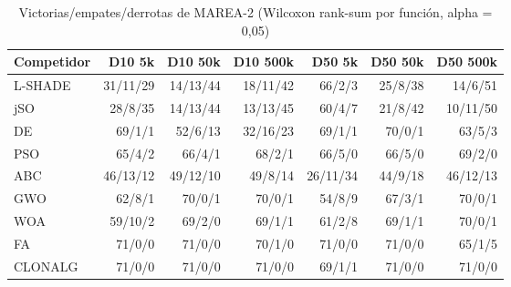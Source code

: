 \begin{table}[ht]\centering\small
\caption{Victorias/empates/derrotas de MAREA-2 (Wilcoxon rank-sum por función, alpha = 0,05)}
\begin{tabular}{lrrrrrr}
\toprule
Competidor & D10 5k & D10 50k & D10 500k & D50 5k & D50 50k & D50 500k \\
\midrule
L-SHADE & 31/11/29 & 14/13/44 & 18/11/42 & 66/2/3 & 25/8/38 & 14/6/51 \\
jSO & 28/8/35 & 14/13/44 & 13/13/45 & 60/4/7 & 21/8/42 & 10/11/50 \\
DE & 69/1/1 & 52/6/13 & 32/16/23 & 69/1/1 & 70/0/1 & 63/5/3 \\
PSO & 65/4/2 & 66/4/1 & 68/2/1 & 66/5/0 & 66/5/0 & 69/2/0 \\
ABC & 46/13/12 & 49/12/10 & 49/8/14 & 26/11/34 & 44/9/18 & 46/12/13 \\
GWO & 62/8/1 & 70/0/1 & 70/0/1 & 54/8/9 & 67/3/1 & 70/0/1 \\
WOA & 59/10/2 & 69/2/0 & 69/1/1 & 61/2/8 & 69/1/1 & 70/0/1 \\
FA & 71/0/0 & 71/0/0 & 70/1/0 & 71/0/0 & 71/0/0 & 65/1/5 \\
CLONALG & 71/0/0 & 71/0/0 & 71/0/0 & 69/1/1 & 71/0/0 & 71/0/0 \\
\bottomrule
\end{tabular}
\end{table}
